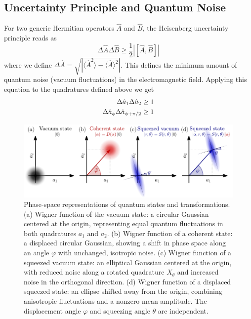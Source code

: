 \subsection*{Uncertainty Principle and Quantum Noise}

For two generic Hermitian operators $\hat{A}$ and $\hat{B}$, the Heisenberg uncertainty principle reads as 
\begin{equation}
  \Delta \hat{A}\Delta \hat{B} \geq \frac{1}{2} |[\hat{A}, \hat{B}]|
\end{equation}
where we define $\Delta \hat{A}=\sqrt{|\langle \hat{A}^2\rangle - \langle \hat{A} \rangle^2|}$. This defines the minimum amount of quantum noise (vacuum fluctuations) in the electromagnetic field.
Applying this equation to the quadratures defined above we get 
\begin{equation}
   \begin{split}
    \Delta \hat{a}_{1} \Delta \hat{a}_{2} &\geq 1 \\
    \Delta \hat{a}_{\phi \vphantom{\pi/2}} \Delta \hat{a}_{\phi +\pi/2} &\geq 1
   \end{split}
\end{equation}

\begin{figure}
\centering
\includegraphics[width=\textwidth]{./chap2/fig/quantum_states.pdf}
\caption{Phase-space representations of quantum states and transformations.
(a) Wigner function of the vacuum state: a circular Gaussian centered at the origin, representing equal quantum fluctuations in both quadratures $a_1$ and $a_2$.
(b) Wigner function of a coherent state: a displaced circular Gaussian, showing a shift in phase space along an angle $\varphi$ with unchanged, isotropic noise.
(c) Wigner function of a squeezed vacuum state: an elliptical Gaussian centered at the origin, with reduced noise along a rotated quadrature $X_\theta$ and increased noise in the orthogonal direction.
(d) Wigner function of a displaced squeezed state: an ellipse shifted away from the origin, combining anisotropic fluctuations and a nonzero mean amplitude. The displacement angle $\varphi$ and squeezing angle $\theta$ are independent.} 
\end{figure}

